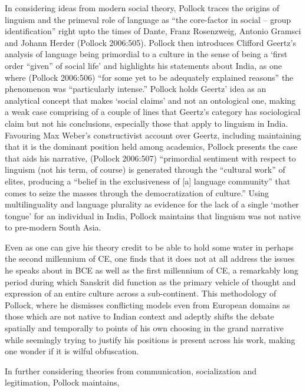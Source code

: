 In considering ideas from modern social theory, Pollock traces the origins of linguism and the primeval role of language as “the core-factor in social – group identification” right upto the times of Dante, Franz Rosenzweig, Antonio Gramsci and Johann Herder (Pollock 2006:505). Pollock then introduces Clifford Geertz’s analysis of language being primordial to a culture in the sense of being a ‘first order “given” of social life’ and highlights his statements about India, as one where (Pollock 2006:506) “for some yet to be adequately explained reasons” the phenomenon was “particularly intense.” Pollock holds Geertz’ idea as an analytical concept that makes ‘social claims’ and not an ontological one, making a weak case comprising of a couple of lines that Geertz’s category has sociological claim but not his conclusions, especially those that apply to linguism in India. Favouring Max Weber’s constructivist account over Geertz, including maintaining that it is the dominant position held among academics, Pollock presents the case that aids his narrative, (Pollock 2006:507) “primordial sentiment with respect to linguism (not his term, of course) is generated through the “cultural work” of elites, producing a “belief in the exclusiveness of [a] language community” that comes to seize the masses through the democratization of culture.” Using multilinguality and language plurality as evidence for the lack of a single ‘mother tongue’ for an individual in India, Pollock maintains that linguism was not native to pre-modern South Asia.

Even as one can give his theory credit to be able to hold some water in perhaps the second millennium of CE, one finds that it does not at all address the issues he speaks about in BCE as well as the first millennium of CE, a remarkably long period during which Sanskrit did function as the primary vehicle of thought and expression of an entire culture across a sub-continent. This methodology of Pollock, where he dismisses conflicting models even from European domains as those which are not native to Indian context and adeptly shifts the debate spatially and temporally to points of his own choosing in the grand narrative while seemingly trying to justify his positions is present across his work, making one wonder if it is wilful obfuscation.

In further considering theories from communication, socialization and legitimation, Pollock maintains,

